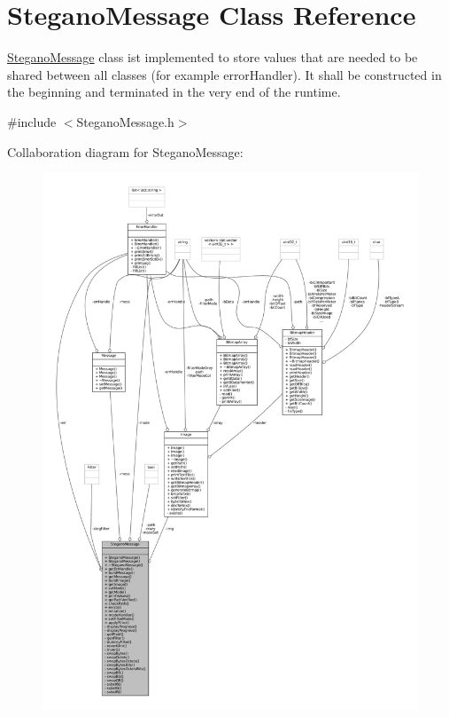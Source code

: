 \hypertarget{classSteganoMessage}{}\section{Stegano\+Message Class Reference}
\label{classSteganoMessage}


\mbox{\hyperlink{classSteganoMessage}{Stegano\+Message}} class ist implemented to store values that are needed to be shared between all classes (for example error\+Handler). It shall be constructed in the beginning and terminated in the very end of the runtime.  




{\ttfamily \#include $<$Stegano\+Message.\+h$>$}



Collaboration diagram for Stegano\+Message\+:\nopagebreak
\begin{figure}[H]
\begin{center}
\leavevmode
\includegraphics[width=350pt]{classSteganoMessage__coll__graph}
\end{center}
\end{figure}
